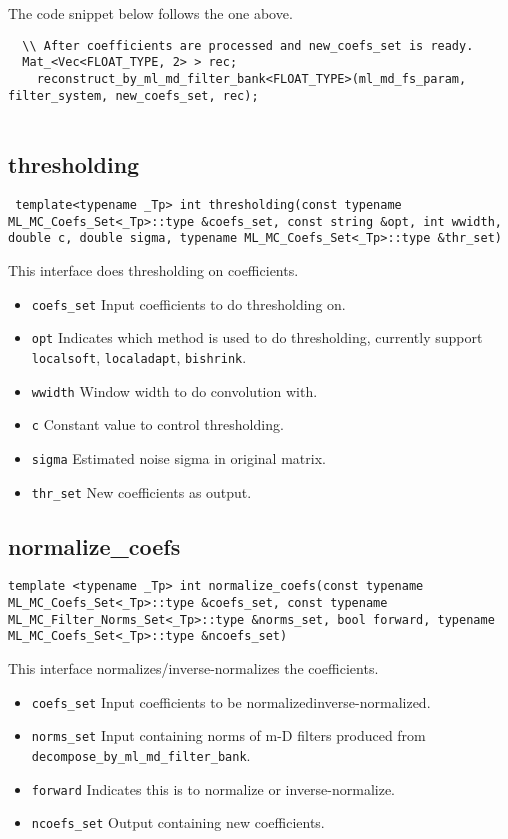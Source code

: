 \documentclass[a4paper,5pt]{article}
\begin{document}
The code snippet below follows the one above.

\begin{lstlisting}
  \\ After coefficients are processed and new_coefs_set is ready.
  Mat_<Vec<FLOAT_TYPE, 2> > rec;
	reconstruct_by_ml_md_filter_bank<FLOAT_TYPE>(ml_md_fs_param, filter_system, new_coefs_set, rec);
	
\end{lstlisting}

\subsection{thresholding}

\lstinline{ template<typename _Tp> int thresholding(const typename ML_MC_Coefs_Set<_Tp>::type &coefs_set, const string &opt, int wwidth, double c, double sigma, typename ML_MC_Coefs_Set<_Tp>::type &thr_set) }

This interface does thresholding on coefficients.
\begin{itemize}
\item \lstinline{coefs_set} Input coefficients to do thresholding on.
\item \lstinline{opt} Indicates which method is used to do thresholding, currently support \lstinline{localsoft}, \lstinline{localadapt}, \lstinline{bishrink}.
\item \lstinline{wwidth} Window width to do convolution with.
\item \lstinline{c} Constant value to control thresholding.
\item \lstinline{sigma} Estimated noise sigma in original matrix.
\item \lstinline{thr_set} New coefficients as output.
\end{itemize}

\subsection{normalize\_coefs}

\lstinline{template <typename _Tp> int normalize_coefs(const typename ML_MC_Coefs_Set<_Tp>::type &coefs_set, const typename ML_MC_Filter_Norms_Set<_Tp>::type &norms_set, bool forward, typename ML_MC_Coefs_Set<_Tp>::type &ncoefs_set) }

This interface normalizes/inverse-normalizes the coefficients.

\begin{itemize}
\item \lstinline{coefs_set} Input coefficients to be normalized\/inverse-normalized.
\item \lstinline{norms_set} Input containing norms of m-D filters produced from \lstinline{decompose_by_ml_md_filter_bank}.
\item \lstinline{forward} Indicates this is to normalize or inverse-normalize.
\item \lstinline{ncoefs_set} Output containing new coefficients.
\end{itemize}
\end{document}
